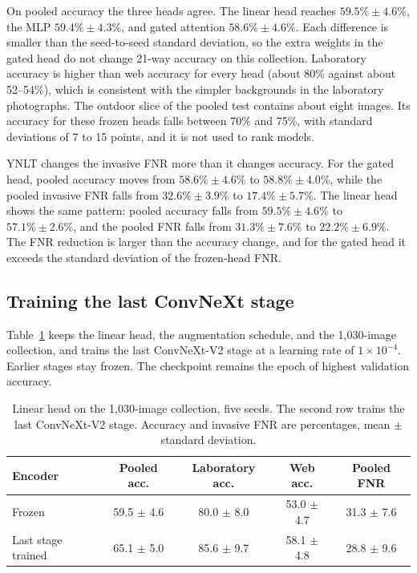 \documentclass[final,3p,times,twocolumn]{elsarticle}
\begin{document}
On pooled accuracy the three heads agree. The linear head reaches \(59.5\% \pm 4.6\%\), the MLP \(59.4\% \pm 4.3\%\), and gated attention \(58.6\% \pm 4.6\%\). Each difference is smaller than the seed-to-seed standard deviation, so the extra weights in the gated head do not change 21-way accuracy on this collection. Laboratory accuracy is higher than web accuracy for every head (about 80\% against about 52--54\%), which is consistent with the simpler backgrounds in the laboratory photographs. The outdoor slice of the pooled test contains about eight images. Its accuracy for these frozen heads falls between 70\% and 75\%, with standard deviations of 7 to 15 points, and it is not used to rank models.

YNLT changes the invasive FNR more than it changes accuracy. For the gated head, pooled accuracy moves from \(58.6\% \pm 4.6\%\) to \(58.8\% \pm 4.0\%\), while the pooled invasive FNR falls from \(32.6\% \pm 3.9\%\) to \(17.4\% \pm 5.7\%\). The linear head shows the same pattern: pooled accuracy falls from \(59.5\% \pm 4.6\%\) to \(57.1\% \pm 2.6\%\), and the pooled FNR falls from \(31.3\% \pm 7.6\%\) to \(22.2\% \pm 6.9\%\). The FNR reduction is larger than the accuracy change, and for the gated head it exceeds the standard deviation of the frozen-head FNR.

\subsection{Training the last ConvNeXt stage}
\label{subsec:laststage}

Table~\ref{tab:laststage} keeps the linear head, the augmentation schedule, and the 1{,}030-image collection, and trains the last ConvNeXt-V2 stage at a learning rate of \(1\times 10^{-4}\). Earlier stages stay frozen. The checkpoint remains the epoch of highest validation accuracy.

\begin{table}[!ht]
    \centering
    \caption{Linear head on the 1{,}030-image collection, five seeds. The second row trains the last ConvNeXt-V2 stage. Accuracy and invasive FNR are percentages, mean \(\pm\) standard deviation.}
    \label{tab:laststage}
    \renewcommand{\arraystretch}{1.2}
    \small
    \begin{tabular}{lcccc}
        \hline
        \textbf{Encoder} & \textbf{Pooled acc.} & \textbf{Laboratory acc.} & \textbf{Web acc.} & \textbf{Pooled FNR} \\
        \hline
        Frozen & 59.5 $\pm$ 4.6 & 80.0 $\pm$ 8.0 & 53.0 $\pm$ 4.7 & 31.3 $\pm$ 7.6 \\
        Last stage trained & 65.1 $\pm$ 5.0 & 85.6 $\pm$ 9.7 & 58.1 $\pm$ 4.8 & 28.8 $\pm$ 9.6 \\
        \hline
    \end{tabular}
\end{table}
\end{document}
